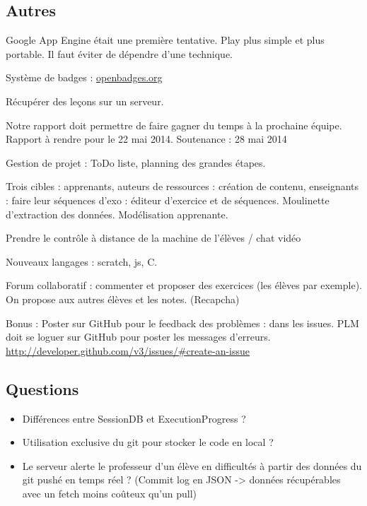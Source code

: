 \documentclass[12pt,a4paper]{article}
\begin{document}
\subsection{Autres}

Google App Engine était une première tentative. Play plus simple et plus portable. Il faut éviter de dépendre d'une technique.

Système de badges : \url{openbadges.org}

Récupérer des leçons sur un serveur.

Notre rapport doit permettre de faire gagner du temps à la prochaine équipe. Rapport à rendre pour le 22 mai 2014. Soutenance : 28 mai 2014

Gestion de projet : ToDo liste, planning des grandes étapes.

Trois cibles : apprenants, auteurs de ressources : création de contenu, enseignants : faire leur séquences d'exo : éditeur d'exercice et de séquences.
Moulinette d'extraction des données. Modélisation apprenante.

Prendre le contrôle à distance de la machine de l'élèves / chat vidéo

Nouveaux langages : scratch, js, C.

Forum collaboratif : commenter et proposer des exercices (les élèves par exemple). On propose aux autres élèves et les notes. (Recapcha) 


Bonus :
Poster sur GitHub pour le feedback des problèmes : dans les issues.
PLM doit se loguer sur GitHub pour poster les messages d'erreurs.
\url{http://developer.github.com/v3/issues/#create-an-issue}

\subsection{Questions}
\begin{itemize}
\item Différences entre SessionDB et ExecutionProgress ?
\item Utilisation exclusive du git pour stocker le code en local ?
\item Le serveur alerte le professeur d'un élève en difficultés à partir des données du git pushé en temps réel ? (Commit log en JSON -> données récupérables avec un fetch moins coûteux qu'un pull)
\end{itemize}
\end{document}
